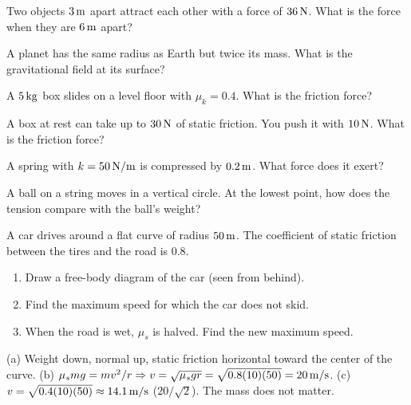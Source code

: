 \begin{exo}{}
Two objects $3\,\mathrm{m}$ apart attract each other with a force of $36\,\mathrm{N}$. What is the force when they are $6\,\mathrm{m}$ apart?
\choices{$18\N$}{$9\N$}{$72\N$}{$4\N$}
\end{exo}
\begin{exo}{}
A planet has the same radius as Earth but twice its mass. What is the gravitational field at its surface?
\end{exo}
\begin{exo}{}
A $5\,\mathrm{kg}$ box slides on a level floor with $\mu_k=0.4$. What is the friction force?
\choices{$20\N$}{$2\N$}{$50\N$}{$12.5\N$}
\end{exo}
\begin{exo}{}
A box at rest can take up to $30\,\mathrm{N}$ of static friction. You push it with $10\N$. What is the friction force?
\end{exo}
\begin{exo}{}
A spring with $k=50\,\mathrm{N/m}$ is compressed by $0.2\,\mathrm{m}$. What force does it exert?
\choices{$250\N$}{$10\N$}{$2.5\N$}{$0.004\N$}
\end{exo}
\begin{exo}{}
A ball on a string moves in a vertical circle. At the lowest point, how does the tension compare with the ball's weight?
\end{exo}
\begin{exo}{}
A car drives around a flat curve of radius $50\,\mathrm{m}$. The coefficient of static friction between the tires and the road is $0.8$.
\begin{enumerate}[label=(\alph*)]
\item Draw a free-body diagram of the car (seen from behind).
\item Find the maximum speed for which the car does not skid.
\item When the road is wet, $\mu_s$ is halved. Find the new maximum speed.
\end{enumerate}
\work{4.5cm}
\begin{solution}
(a) Weight down, normal up, static friction horizontal toward the center of the curve. \;(b) $\mu_smg=mv^2/r\Rightarrow v=\sqrt{\mu_sgr}=\sqrt{0.8(10)(50)}=20\,\mathrm{m/s}$. \;(c) $v=\sqrt{0.4(10)(50)}\approx14.1\,\mathrm{m/s}$ ($20/\sqrt2$). The mass does not matter.
\end{solution}
\end{exo}

